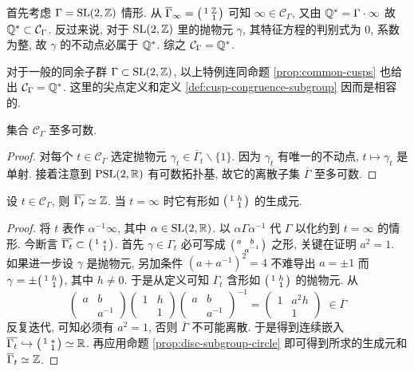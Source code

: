 \begin{example}
	首先考虑 $\Gamma = \operatorname{SL}(2,\mathbb{Z})$ 情形. 从 $\overline{\Gamma}_\infty = \bigl(\begin{smallmatrix} 1 & \mathbb{Z} \\  & 1 \end{smallmatrix}\bigr)$ 可知 $\infty \in \mathcal{C}_\Gamma$, 又由 $\mathbb{Q}^* = \Gamma \cdot \infty$ 故 $\mathbb{Q}^* \subset \mathcal{C}_\Gamma$. 反过来说, 对于 $\operatorname{SL}(2,\mathbb{Z})$ 里的抛物元 $\gamma$, 其特征方程的判别式为 $0$, 系数为整, 故 $\gamma$ 的不动点必属于 $\mathbb{Q}^*$. 综之 $\mathcal{C}_\Gamma = \mathbb{Q}^*$.
	
	对于一般的同余子群 $\Gamma \subset \operatorname{SL}(2,\mathbb{Z})$, 以上特例连同命题 \ref{prop:common-cusps} 也给出 $\mathcal{C}_\Gamma = \mathbb{Q}^*$. 这里的尖点定义和定义 \ref{def:cusp-congruence-subgroup} 因而是相容的.
\end{example}

\begin{lemma}\label{prop:cusp-countable}
	集合 $\mathcal{C}_\Gamma$ 至多可数.
\end{lemma}
\begin{proof}
	对每个 $t \in \mathcal{C}_\Gamma$ 选定抛物元 $\gamma_t \in \overline{\Gamma}_t \smallsetminus \{1\}$. 因为 $\gamma_t$ 有唯一的不动点, $t \mapsto \gamma_t$ 是单射. 接着注意到 $\operatorname{PSL}(2,\mathbb{R})$ 有可数拓扑基, 故它的离散子集 $\overline{\Gamma}$ 至多可数.
\end{proof}

\begin{lemma}\label{prop:cusp-stabilizer}
	设 $t \in \mathcal{C}_\Gamma$, 则 $\overline{\Gamma_t} \simeq \mathbb{Z}$. 当 $t=\infty$ 时它有形如 $\bigl(\begin{smallmatrix} 1 & h \\  & 1 \end{smallmatrix}\bigr)$ 的生成元.
\end{lemma}
\begin{proof}
	将 $t$ 表作 $\alpha^{-1}\infty$, 其中 $\alpha \in \operatorname{SL}(2,\mathbb{R})$. 以 $\alpha\Gamma\alpha^{-1}$ 代 $\Gamma$ 以化约到 $t=\infty$ 的情形. 今断言 $\overline{\Gamma_t} \subset \bigl(\begin{smallmatrix} 1 & * \\  & 1 \end{smallmatrix}\bigr)$. 首先 $\gamma \in \Gamma_t$ 必可写成 $\bigl(\begin{smallmatrix} a & b \\  & a^{-1} \end{smallmatrix}\bigr)$ 之形, 关键在证明 $a^2 = 1$. 如果进一步设 $\gamma$ 是抛物元, 另加条件 $(a+a^{-1})^2 = 4$ 不难导出 $a = \pm 1$ 而 $\gamma = \pm\bigl(\begin{smallmatrix} 1 & h \\  & 1 \end{smallmatrix}\bigr)$, 其中 $h \neq 0$. 于是从定义可知 $\overline{\Gamma}_t$ 含形如 $\bigl(\begin{smallmatrix} 1 & h \\  & 1 \end{smallmatrix}\bigr)$ 的抛物元. 从
	\[ \begin{pmatrix} a & b \\ & a^{-1} \end{pmatrix} \begin{pmatrix} 1 & h \\ & 1 \end{pmatrix} \left(\begin{matrix} a & b \\ & a^{-1} \end{matrix}\right)^{-1} = \begin{pmatrix} 1 & a^2 h \\ & 1 \end{pmatrix} \; \in \overline{\Gamma} \]
	反复迭代, 可知必须有 $a^2=1$, 否则 $\overline{\Gamma}$ 不可能离散. 于是得到连续嵌入 $\overline{\Gamma_t} \hookrightarrow \bigl(\begin{smallmatrix} 1 & * \\  & 1 \end{smallmatrix}\bigr) \simeq \mathbb{R}$. 再应用命题 \ref{prop:disc-subgroup-circle} 即可得到所求的生成元和 $\overline{\Gamma}_t \simeq \mathbb{Z}$.
\end{proof}

